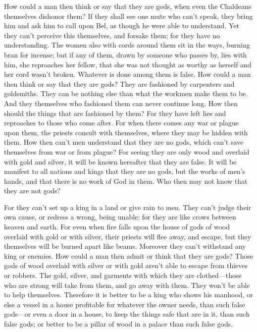  How could a man then think or say that they are gods,
when even the Chaldeans themselves dishonor them?  If
they shall see one mute who can't speak, they bring him and ask him to
call upon Bel, as though he were able to understand.  Yet
they can't perceive this themselves, and forsake them; for they have no
understanding.  The women also with cords around them sit
in the ways, burning bran for incense; but if any of them, drawn by
someone who passes by, lies with him, she reproaches her fellow, that
she was not thought as worthy as herself and her cord wasn't broken.
 Whatever is done among them is false. How could a man
then think or say that they are gods?  They are fashioned
by carpenters and goldsmiths. They can be nothing else than what the
workmen make them to be.  And they themselves who
fashioned them can never continue long. How then should the things that
are fashioned by them?  For they have left lies and
reproaches to those who come after.  For when there comes
any war or plague upon them, the priests consult with themselves, where
they may be hidden with them.  How then can't men
understand that they are no gods, which can't save themselves from war
or from plague?  For seeing they are only wood and
overlaid with gold and silver, it will be known hereafter that they are
false.  It will be manifest to all nations and kings that
they are no gods, but the works of men's hands, and that there is no
work of God in them.  Who then may not know that they are
not gods?

 For they can't set up a king in a land or give rain to
men.  They can't judge their own cause, or redress a
wrong, being unable; for they are like crows between heaven and earth.
 For even when fire falls upon the house of gods of wood
overlaid with gold or with silver, their priests will flee away, and
escape, but they themselves will be burned apart like beams.
 Moreover they can't withstand any king or enemies. How
could a man then admit or think that they are gods? 
Those gods of wood overlaid with silver or with gold aren't able to
escape from thieves or robbers.  The gold, silver, and
garments with which they are clothed---those who are strong will take
from them, and go away with them. They won't be able to help themselves.
 Therefore it is better to be a king who shows his
manhood, or else a vessel in a house profitable for whatever the owner
needs, than such false gods---or even a door in a house, to keep the
things safe that are in it, than such false gods; or better to be a
pillar of wood in a palace than such false gods.

